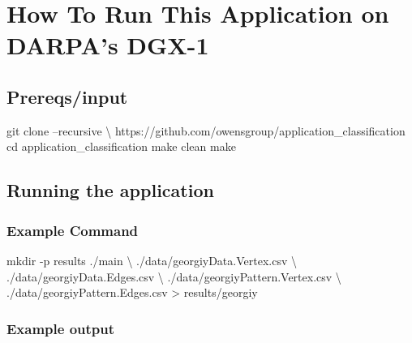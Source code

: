 \documentclass[10pt,oneside]{memoir}
\newenvironment{Shaded}{}{}
\newcommand{\BuiltInTok}[1]{#1}
\newcommand{\ExtensionTok}[1]{#1}
\newcommand{\FunctionTok}[1]{\textcolor[rgb]{0.02,0.16,0.49}{#1}}
\newcommand{\NormalTok}[1]{#1}
\newcommand{\OperatorTok}[1]{\textcolor[rgb]{0.40,0.40,0.40}{#1}}
\begin{document}
\hypertarget{how-to-run-this-application-on-darpas-dgx-1}{%
\section{How To Run This Application on DARPA's
DGX-1}\label{how-to-run-this-application-on-darpas-dgx-1}}

\hypertarget{prereqsinput}{%
\subsection{Prereqs/input}\label{prereqsinput}}

\begin{Shaded}
\begin{Highlighting}[]
\FunctionTok{git}\NormalTok{ clone --recursive \textbackslash{}}
\NormalTok{        https://github.com/owensgroup/application_classification}
\BuiltInTok{cd}\NormalTok{ application_classification}
\FunctionTok{make}\NormalTok{ clean}
\FunctionTok{make}
\end{Highlighting}
\end{Shaded}

\hypertarget{running-the-application}{%
\subsection{Running the application}\label{running-the-application}}

\hypertarget{example-command}{%
\subsubsection{Example Command}\label{example-command}}

\begin{Shaded}
\begin{Highlighting}[]
\FunctionTok{mkdir}\NormalTok{ -p results}
\ExtensionTok{./main}\NormalTok{ \textbackslash{}}
\NormalTok{    ./data/georgiyData.Vertex.csv \textbackslash{}}
\NormalTok{    ./data/georgiyData.Edges.csv \textbackslash{}}
\NormalTok{    ./data/georgiyPattern.Vertex.csv \textbackslash{}}
\NormalTok{    ./data/georgiyPattern.Edges.csv }\OperatorTok{>}\NormalTok{ results/georgiy}
\end{Highlighting}
\end{Shaded}

\hypertarget{example-output}{%
\subsubsection{Example output}\label{example-output}}
\end{document}
